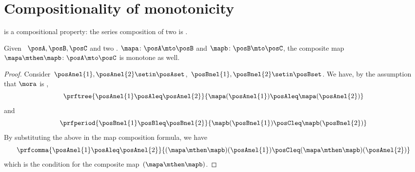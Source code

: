 
\section{Compositionality of monotonicity}
 is a compositional property: the series composition of two  is .
\begin{lemma}\label{lem:monotonicity-compositional}
    Given ~$\posA,\posB,\posC$ and two .
    $\mapa\colon \posA \mto \posB$ and $\mapb\colon \posB \mto \posC$, the composite map~$\mapa\mthen \mapb\colon \posA \mto \posC$ is monotone as well.
\end{lemma}
\begin{proof}
    Consider~$\posAnel{1},\posAnel{2} \setin \posAset$,~$\posBnel{1},\posBnel{2}\setin \posBset$.
    We have, by the assumption that $\mora$ is ,
    \begin{equation}\label{eq:monotonicity-compositional-1}
        \prftree{\posAnel{1}\posAleq \posAnel{2}}{\mapa(\posAnel{1})\posAleq \mapa(\posAnel{2})}
    \end{equation}
    and
    \begin{equation}\label{eq:monotonicity-compositional-2}
        \prfperiod{\posBnel{1}\posBleq \posBnel{2}}{\mapb(\posBnel{1})\posCleq \mapb(\posBnel{2})}
    \end{equation}
    By substituting the above in the map composition formula, we have
    \begin{equation}\label{eq:monotonicity-compositional-3}
        \prfcomma{\posAnel{1}\posAleq \posAnel{2} }{ (\mapa\mthen \mapb)(\posAnel{1}) \posCleq (\mapa\mthen \mapb)(\posAnel{2})}
    \end{equation}
    which is the  condition for the composite map~$(\mapa\mthen\mapb)$.
\end{proof}
